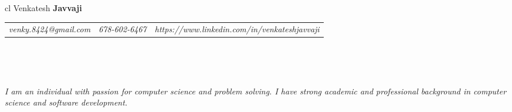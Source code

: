 \documentclass[10pt,a4paper,oneside]{article}
\begin{document}
    \begin{center}
        \begin{tabular}{cl}
            {\Huge \textmd{Venkatesh} \textbf{Javvaji}}\\
            \begin{tabular}{c|c|c}
                \textit{venky.8424@gmail.com}&\textit{678-602-6467}&\textit{https://www.linkedin.com/in/venkateshjavvaji}
            \end{tabular}\\                       
        \end{tabular}\\[0.3cm]
        \textcolor{light-gray}{\hrulefill} 
    \end{center} 
    \begin{adjustwidth}{0pt}{0pt}
    \textit{\normalsize I am an individual with passion for computer science and problem solving. I have strong academic and professional background in computer science and software development.}
    \end{adjustwidth}
\end{document}
